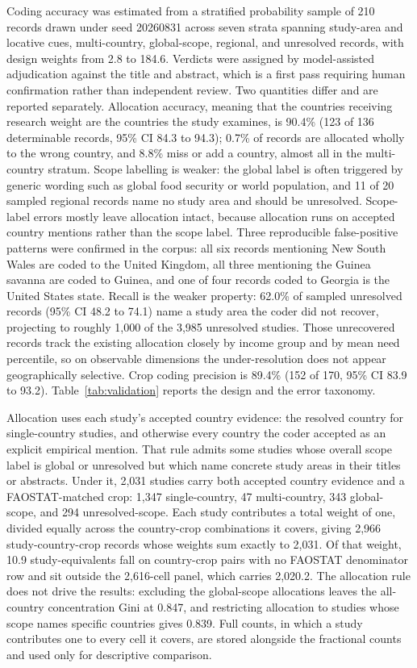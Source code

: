 \documentclass[ASNA,twocolumn]{USG}
\begin{document}
Coding accuracy was estimated from a stratified probability sample of 210 records drawn under
seed 20260831 across seven strata spanning study-area and locative cues, multi-country,
global-scope, regional, and unresolved records, with design weights from 2.8 to 184.6. Verdicts
were assigned by model-assisted adjudication against the title and abstract, which is a first
pass requiring human confirmation rather than independent review. Two quantities differ and are
reported separately. Allocation accuracy, meaning that the countries receiving research weight
are the countries the study examines, is 90.4\% (123 of 136 determinable records, 95\% CI 84.3 to
94.3); 0.7\% of records are allocated wholly to the wrong country, and 8.8\% miss or add a
country, almost all in the multi-country stratum. Scope labelling is weaker: the global label is
often triggered by generic wording such as global food security or world population, and 11 of 20
sampled regional records name no study area and should be unresolved. Scope-label errors mostly
leave allocation intact, because allocation runs on accepted country mentions rather than the
scope label. Three reproducible false-positive patterns were confirmed in the corpus: all
six records mentioning New South Wales are coded to the United Kingdom, all three mentioning the
Guinea savanna are coded to Guinea, and one of four records coded to Georgia is the United States
state. Recall is the weaker property: 62.0\% of sampled unresolved records (95\% CI 48.2 to 74.1)
name a study area the coder did not recover, projecting to roughly 1,000 of the 3,985 unresolved
studies. Those unrecovered records track the existing allocation closely by income group and by
mean need percentile, so on observable dimensions the under-resolution does not appear
geographically selective. Crop coding precision is 89.4\% (152 of 170, 95\% CI 83.9 to 93.2).
Table~\ref{tab:validation} reports the design and the error taxonomy.

Allocation uses each study's accepted country evidence: the resolved country for single-country
studies, and otherwise every country the coder accepted as an explicit empirical mention. That rule admits some studies whose overall scope label is global or
unresolved but which name concrete study areas in their titles or abstracts. Under it, 2,031
studies carry both accepted country evidence and a FAOSTAT-matched crop: 1,347
single-country, 47 multi-country, 343 global-scope, and 294 unresolved-scope. Each study
contributes a total weight of one, divided equally across the country-crop combinations it
covers, giving 2,966 study-country-crop records whose weights sum exactly to 2,031. Of that
weight, 10.9 study-equivalents fall on country-crop pairs with no FAOSTAT denominator row
and sit outside the 2,616-cell panel, which carries 2,020.2. The allocation rule does not
drive the results: excluding the global-scope allocations leaves the all-country
concentration Gini at 0.847, and restricting allocation to studies whose scope names
specific countries gives 0.839. Full counts, in which a study contributes one to every cell
it covers, are stored alongside the fractional counts and used only for descriptive
comparison.
\end{document}
